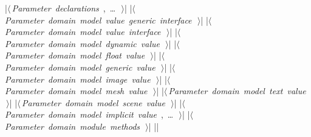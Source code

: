 \documentclass[%
    a4paper,    %
    justified,  %
    nobib,      %
    openany     %
]{tufte-book}
\begin{document}
\begin{fullwidth}
\begin{flushleft}
\begin{minipage}{\linewidth}
\begin{pythoncode}
|\hbox{$\langle\,${\itshape Parameter declarations}\nobreak\ {\footnotesize {}, \ldots\ }$\,\rangle$}|
|\hbox{$\langle\,${\itshape Parameter domain model value generic interface}\nobreak\ {\footnotesize {}}$\,\rangle$}|
|\hbox{$\langle\,${\itshape Parameter domain model value interface}\nobreak\ {\footnotesize {}}$\,\rangle$}|
|\hbox{$\langle\,${\itshape Parameter domain model dynamic value}\nobreak\ {\footnotesize {}}$\,\rangle$}|
|\hbox{$\langle\,${\itshape Parameter domain model float value}\nobreak\ {\footnotesize {}}$\,\rangle$}|
|\hbox{$\langle\,${\itshape Parameter domain model generic value}\nobreak\ {\footnotesize {}}$\,\rangle$}|
|\hbox{$\langle\,${\itshape Parameter domain model image value}\nobreak\ {\footnotesize {}}$\,\rangle$}|
|\hbox{$\langle\,${\itshape Parameter domain model mesh value}\nobreak\ {\footnotesize {}}$\,\rangle$}|
|\hbox{$\langle\,${\itshape Parameter domain model text value}\nobreak\ {\footnotesize {}}$\,\rangle$}|
|\hbox{$\langle\,${\itshape Parameter domain model scene value}\nobreak\ {\footnotesize {}}$\,\rangle$}|
|\hbox{$\langle\,${\itshape Parameter domain model implicit value}\nobreak\ {\footnotesize {}, \ldots\ }$\,\rangle$}|
|\hbox{$\langle\,${\itshape Parameter domain module methods}\nobreak\ {\footnotesize {}}$\,\rangle$}|
|\NWsep|
\end{pythoncode}
\vspace{1.5ex}
\footnotesize
\begin{list}{}{\setlength{\itemsep}{-\parsep}\setlength{\itemindent}{-\leftmargin}}


\end{list}
\end{minipage}
\end{flushleft}
\end{fullwidth}
\end{document}

